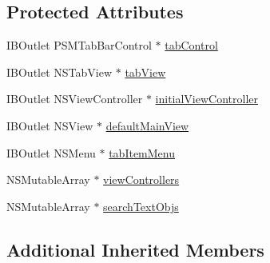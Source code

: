 \subsection*{Protected Attributes}
\begin{DoxyCompactItemize}
\item 
I\-B\-Outlet P\-S\-M\-Tab\-Bar\-Control $\ast$ \hyperlink{interface_workspace_view_host_controller_ad0f5a510946e9b0b7af041c92306e7ef}{tab\-Control}
\item 
I\-B\-Outlet N\-S\-Tab\-View $\ast$ \hyperlink{interface_workspace_view_host_controller_ab4a1de68f4e691f316593c68f32fc9ba}{tab\-View}
\item 
I\-B\-Outlet N\-S\-View\-Controller $\ast$ \hyperlink{interface_workspace_view_host_controller_a9b46a0c0ba9bac245021c2984d24758f}{initial\-View\-Controller}
\item 
I\-B\-Outlet N\-S\-View $\ast$ \hyperlink{interface_workspace_view_host_controller_afaf488a28194f8391e341733f6fc5143}{default\-Main\-View}
\item 
I\-B\-Outlet N\-S\-Menu $\ast$ \hyperlink{interface_workspace_view_host_controller_a78b24083a13da938a7e75ea92b8cff88}{tab\-Item\-Menu}
\item 
N\-S\-Mutable\-Array $\ast$ \hyperlink{interface_workspace_view_host_controller_a588ec80eb0221384c948a3ff05bd9372}{view\-Controllers}
\item 
N\-S\-Mutable\-Array $\ast$ \hyperlink{interface_workspace_view_host_controller_a83d5760a6f006dd513ac27edcec6b68c}{search\-Text\-Objs}
\end{DoxyCompactItemize}
\subsection*{Additional Inherited Members}


